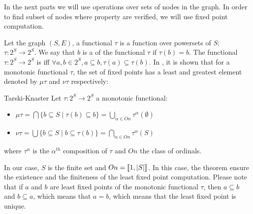 In the next parts we will use operations over sets of nodes in the graph. In order to find subset of nodes where property are verified, we will use fixed point computation.

Let the graph $(S,E)$, a functional $\tau$ is a function over powersets of $S$: $\tau: 2^S \rightarrow 2^S$. We say that $b$ is a  of the functional $\tau$ if $\tau(b) = b$.
The functional $\tau: 2^S \rightarrow 2^S$ is   iff $\forall a,b \in 2^S, a \subseteq b, \tau(a) \subseteq \tau(b)$.
In \cite{tarski}, it is shown that for a monotonic functional $\tau$, the set of fixed points has a least and greatest element denoted by $\mu \tau$ and $\nu \tau$ respectively:

\begin{namedtheo}{Tarski-Knaster}\label{th:tarski}
Let $\tau:2^S \rightarrow 2^S$ a monotonic functional:
\begin{itemize}
\item $\mu \tau = \bigcap \{b \subseteq S \mid \tau(b) \subseteq b\} = \bigcup_{\alpha \in On} \tau^{\alpha}(\emptyset)$
\item $\nu \tau = \bigcup \{b \subseteq S \mid b \subseteq \tau(b) \} = \bigcap_{\alpha \in On} \tau^{\alpha}(S)$
\end{itemize}
where $\tau^{\alpha}$ is the $\alpha^{th}$ composition of $\tau$ and $On$ the class of ordinals.
\end{namedtheo}
In our case, $S$ is the finite set and $On = \left \llbracket 1,|S|\right \rrbracket$. 
In this case, the theorem ensure the existence and the finiteness of the least fixed point computation.
Please note that if $a$ and $b$ are least fixed points of the monotonic functional $\tau$, then $a \subseteq b$ and $b \subseteq a$, which means that $a=b$, which means that the least fixed point is unique.



%
%


